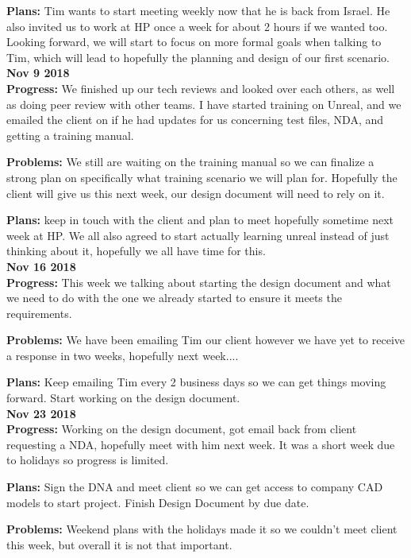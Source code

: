 \textbf{Plans:}
Tim wants to start meeting weekly now that he is back from Israel. He also invited us to work at HP once a week for about 2 hours if we wanted too. Looking forward, we will start to focus on more formal goals when talking to Tim, which will lead to hopefully the planning and design of our first scenario.\\

\textbf{Nov 9 2018}\\
\textbf{Progress:}
We finished up our tech reviews and looked over each others, as well as doing peer review with other teams. I have started training on Unreal, and we emailed the client on if he had updates for us concerning test files, NDA, and getting a training manual.

\textbf{Problems:}
We still are waiting on the training manual so we can finalize a strong plan on specifically what training scenario we will plan for. Hopefully the client will give us this next week, our design document will need to rely on it.

\textbf{Plans:} 
keep in touch with the client and plan to meet hopefully sometime next week at HP. We all also agreed to start actually learning unreal instead of just thinking about it, hopefully we all have time for this.\\

\textbf{Nov 16 2018}\\
\textbf{Progress:}
This week we talking about starting the design document and what we need to do with the one we already started to ensure it meets the requirements.

\textbf{Problems:}
We have been emailing Tim our client however we have yet to receive a response in two weeks, hopefully next week....

\textbf{Plans:}
Keep emailing Tim every 2 business days so we can get things moving forward. Start working on the design document.\\

\textbf{Nov 23 2018}\\
\textbf{Progress:}
Working on the design document, got email back from client requesting a NDA, hopefully meet with him next week. It was a short week due to holidays so progress is limited.

\textbf{Plans:} 
Sign the DNA and meet client so we can get access to company CAD models to start project. Finish Design Document by due date.

\textbf{Problems:} 
Weekend plans with the holidays made it so we couldn't meet client this week, but overall it is not that important.\\

